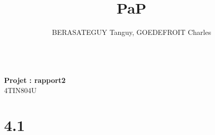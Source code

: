 \documentclass[10pt, a4paper]{article}
\title{PaP}
\author{BERASATEGUY Tanguy, GOEDEFROIT Charles}
\begin{document}
\begin{center}
    \textbf{\LARGE\MyTitle}
    \\[.5cm]
    \textbf{Projet : rapport2}
    \\[.5cm]
    4TIN804U
    \\[.5cm]
    \MyAuthor
\end{center}

\newpage

\tableofcontents

\newpage

\section{4.1}
\end{document}
